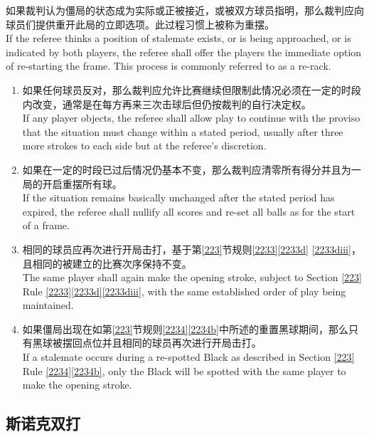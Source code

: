 \noindent 如果裁判认为僵局的状态成为实际或正被接近，或被双方球员指明，那么裁判应向球员们提供重开此局的立即选项。此过程习惯上被称为重摆。\\
If the referee thinks a position of stalemate exists, or is being approached, or is indicated by both players, the referee shall offer the players the immediate option of re-starting the frame. This process is commonly referred to as a re-rack.
\begin{enumerate}[label=(\alph*)]
    \item 如果任何球员反对，那么裁判应允许比赛继续但限制此情况必须在一定的时段内改变，通常是在每方再来三次击球后但仍按裁判的自行决定权。\\
    If any player objects, the referee shall allow play to continue with the proviso that the situation must change within a stated period, usually after three more strokes to each side but at the referee's discretion.
    \item 如果在一定的时段已过后情况仍基本不变，那么裁判应清零所有得分并且为一局的开启重摆所有球。\\
    If the situation remains basically unchanged after the stated period has expired, the referee shall nullify all scores and re-set all balls as for the start of a frame.
    \item 相同的球员应再次进行开局击打，基于第\ref{223}节规则\ref{2233}\ref{2233d} \ref{2233diii}，且相同的被建立的比赛次序保持不变。\\
    The same player shall again make the opening stroke, subject to Section \ref{223} Rule \ref{2233}\ref{2233d}\ref{2233diii}, with the same established order of play being maintained.
    \item 如果僵局出现在如第\ref{223}节规则\ref{2234}\ref{2234b}中所述的重置黑球期间，那么只有黑球被摆回点位并且相同的球员再次进行开局击打。\\
    If a stalemate occurs during a re-spotted Black as described in Section \ref{223} Rule \ref{2234}\ref{2234b}, only the Black will be spotted with the same player to make the opening stroke.
\end{enumerate}

\subsection{斯诺克双打}\label{22318}

